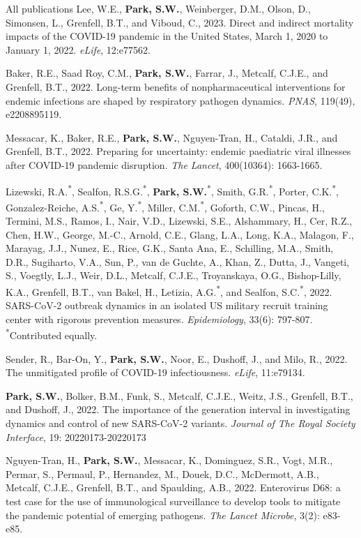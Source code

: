 \documentclass[
	11pt, %
]{resume} %
\begin{document}
\begin{rSection}{All publications}
Lee, W.E., \textbf{Park, S.W.}, Weinberger, D.M., Olson, D., Simonsen, L., Grenfell, B.T., and Viboud, C., 2023. Direct and indirect mortality impacts of the COVID-19 pandemic in the United States, March 1, 2020 to January 1, 2022. \textit{eLife}, 12:e77562.

Baker, R.E., Saad Roy, C.M., \textbf{Park, S.W.}, Farrar, J., Metcalf, C.J.E., and Grenfell, B.T., 2022. Long-term benefits of nonpharmaceutical interventions for endemic infections are shaped by respiratory pathogen dynamics. \textit{PNAS}, 119(49), e2208895119.

Messacar, K., Baker, R.E., \textbf{Park, S.W.}, Nguyen-Tran, H., Cataldi, J.R., and Grenfell, B.T., 2022. Preparing for uncertainty: endemic paediatric viral illnesses after COVID-19 pandemic disruption. \textit{The Lancet}, 400(10364): 1663-1665.

Lizewski, R.A.\textsuperscript{*}, Sealfon, R.S.G.\textsuperscript{*}, \textbf{Park, S.W.}\textsuperscript{*}, Smith, G.R.\textsuperscript{*}, Porter, C.K.\textsuperscript{*}, Gonzalez-Reiche, A.S.\textsuperscript{*}, Ge, Y.\textsuperscript{*}, Miller, C.M.\textsuperscript{*}, Goforth, C.W., Pincas, H., Termini, M.S., Ramos, I., Nair, V.D., Lizewski, S.E., Alshammary, H., Cer, R.Z., Chen, H.W., George, M.-C., Arnold, C.E., Glang, L.A., Long, K.A., Malagon, F., Marayag, J.J., Nunez, E., Rice, G.K., Santa Ana, E., Schilling, M.A., Smith, D.R., Sugiharto, V.A., Sun, P., van de Guchte, A., Khan, Z., Dutta, J., Vangeti, S., Voegtly, L.J., Weir, D.L., Metcalf, C.J.E., Troyanskaya, O.G., Bishop-Lilly, K.A., Grenfell, B.T., van Bakel, H., Letizia, A.G.\textsuperscript{*}, and Sealfon, S.C.\textsuperscript{*}, 2022. SARS-CoV-2 outbreak dynamics in an isolated US military recruit training center with rigorous prevention measures. \textit{Epidemiology}, 33(6): 797-807.\\
\textsuperscript{*}Contributed equally.

Sender, R., Bar-On, Y., \textbf{Park, S.W.}, Noor, E., Dushoff, J., and Milo, R., 2022. The unmitigated profile of COVID-19 infectiousness. \textit{eLife}, 11:e79134.

\textbf{Park, S.W.}, Bolker, B.M., Funk, S., Metcalf, C.J.E., Weitz, J.S., Grenfell, B.T., and Dushoff, J., 2022. The importance of the generation interval in investigating dynamics and control of new SARS-CoV-2 variants. \textit{Journal of The Royal Society Interface}, 19: 20220173-20220173

Nguyen-Tran, H., \textbf{Park, S.W.}, Messacar, K., Dominguez, S.R., Vogt, M.R., Permar, S., Permaul, P., Hernandez, M., Douek, D.C., McDermott, A.B., Metcalf, C.J.E., Grenfell, B.T., and Spaulding, A.B., 2022. Enterovirus D68: a test case for the use of immunological surveillance to develop tools to mitigate the pandemic potential of emerging pathogens. \textit{The Lancet Microbe}, 3(2): e83-e85.


\end{rSection}
\end{document}
